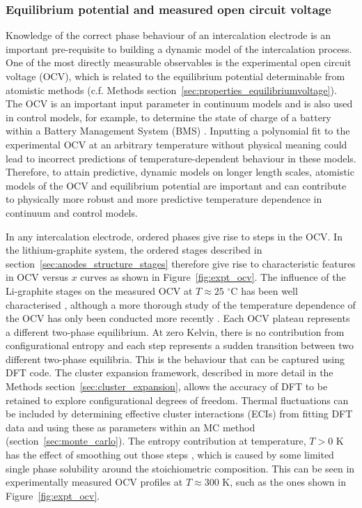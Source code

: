 \documentclass[../main.tex]{subfiles}
\begin{document}
\subsubsection{Equilibrium potential and measured open circuit voltage}
\label{sec:anodes_ocv}

Knowledge of the correct phase behaviour of an intercalation electrode is an important pre-requisite to building a dynamic model of the intercalation process. One of the most directly measurable observables is the experimental open circuit voltage (OCV), which is related to the equilibrium potential determinable from atomistic methods (c.f. Methods section~\ref{sec:properties_equilibriumvoltage}). The OCV is an important input parameter in continuum models and is also used in control models, for example, to determine the state of charge of a battery within a Battery Management System (BMS) \cite{PLETT2004262}. Inputting a polynomial fit to the experimental OCV at an arbitrary temperature without physical meaning could lead to incorrect predictions of temperature-dependent behaviour in these models. Therefore, to attain predictive, dynamic models on longer length scales, atomistic models of the OCV and equilibrium potential are important and can contribute to physically more robust and more predictive temperature dependence in continuum and control models.\cite{VanderVen2020,Urban2016}

In any intercalation electrode, ordered phases give rise to steps in the OCV. In the lithium-graphite system, the ordered stages described in section~\ref{sec:anodes_structure_stages} therefore give rise to characteristic features in OCV versus $x$ curves \cite{Dahn1991,Ohzuku1993} as shown in Figure~\ref{fig:expt_ocv}.  The influence of the Li-graphite stages on the measured OCV at $T \approx 25$ $^{\circ}$C has been well characterised \cite{Sole2014,Zheng1995,Senyshyn2013,Taminato2016,Allart2018,Sethuraman2010,Markevich2005,Dahn1991,Ohzuku1993}, although a more thorough study of the temperature dependence of the OCV has only been conducted more recently \cite{Mercer2021}. Each OCV plateau represents a different two-phase equilibrium. At zero Kelvin, there is no contribution from configurational entropy and each step represents a sudden transition between two different two-phase equilibria. This is the behaviour that can be captured using DFT code. The cluster expansion framework, described in more detail in the Methods section~\ref{sec:cluster_expansion}, allows the accuracy of DFT to be retained to explore configurational degrees of freedom. Thermal fluctuations can be included by determining effective cluster interactions (ECIs) from fitting DFT data and using these as parameters within an MC method (section~\ref{sec:monte_carlo}). The entropy contribution at temperature, $T > 0$ K has the effect of smoothing out those steps \cite{Mercer2019,OTERO2017569,REYNIER2003850,Mercer2021}, which is caused by some limited single phase solubility around the stoichiometric composition. This can be seen in experimentally measured OCV profiles at $T \approx 300$ K, such as the ones shown in Figure~\ref{fig:expt_ocv}.
\end{document}
